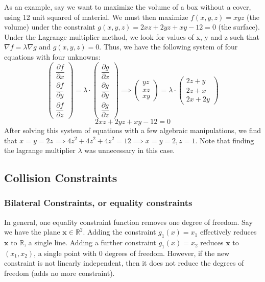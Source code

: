 \documentclass{article}
\begin{document}
As an example, say we want to maximize the volume of a box without a cover, using 12 unit squared of material. We must then maximize $f(x,y,z) = xyz $ (the volume) under the constraint $g(x,y,z) = 2xz + 2yz + xy - 12 = 0$ (the surface). Under the Lagrange multiplier method, we look for values of x, y and z such that $\nabla f = \lambda \nabla g$ and $g(x,y,z) = 0$. Thus, we have the following system of four equations with four unknowns:
\begin{equation}
\begin{pmatrix}
    \dfrac{\partial f}{\partial x} \\ \dfrac{\partial f}{\partial y} \\ \dfrac{\partial f}{\partial z}
\end{pmatrix} = 
\lambda \cdot
\begin{pmatrix}
    \dfrac{\partial g}{\partial x} \\ \dfrac{\partial g}{\partial y} \\ \dfrac{\partial g}{\partial z}
\end{pmatrix} \implies 
\begin{pmatrix}
    yz \\ xz \\ xy
\end{pmatrix} = 
\lambda \cdot
\begin{pmatrix}
    2z+y \\ 2z+x \\ 2x + 2y
\end{pmatrix}
\end{equation}
\begin{equation}
2xz + 2yz + xy - 12 = 0
\end{equation}
After solving this system of equations with a few algebraic manipulations, we find that $x = y = 2z \implies 4 z^2+ 4 z^2+ 4 z^2 = 12 \implies x = y = 2, z=1$. Note that finding the lagrange multiplier $\lambda$ was unnecessary in this case.

\subsection{Collision Constraints}
\subsubsection{Bilateral Constraints, or equality constraints}
In general, one equality constraint function removes one degree of freedom. Say we have the plane $\mathbf{x} \in \mathbb{R}^2$. Adding the constraint $g_1(x) = x_1$ effectively reduces $\mathbf{x}$ to $\mathbb{R}$, a single line. Adding a further constraint $g_1(x) = x_2$ reduces $\mathbf{x}$ to $(x_1, x_2)$, a single point with 0 degrees of freedom. However, if the new constraint is not linearly independent, then it does not reduce the degrees of freedom (adds no more constraint).
\end{document}
